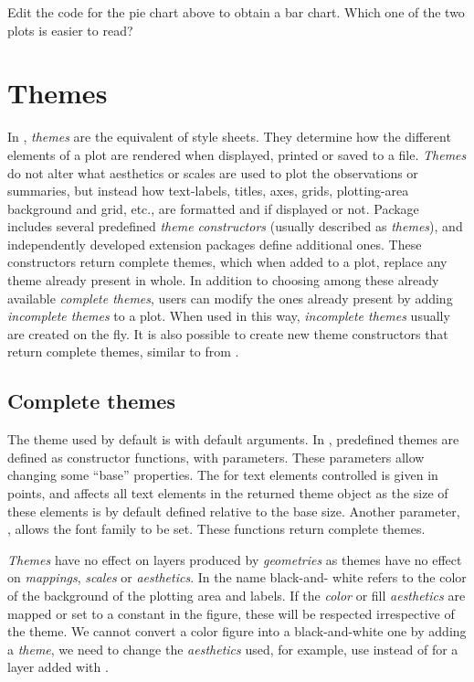 \documentclass[krantz2]{krantz}\usepackage{knitr}
\begin{document}
\begin{playground}
Edit the code for the pie chart above to obtain a bar chart. Which one of the two plots is easier to read?
\end{playground}

\section{Themes}\label{sec:plot:themes}
In \ggplot, \emph{themes} are the equivalent of style sheets. They determine how the different elements of a plot are rendered when displayed, printed or saved to a file. \emph{Themes} do not alter what aesthetics or scales are used to plot the observations or summaries, but instead how text-labels, titles, axes, grids, plotting-area background and grid, etc., are formatted and if displayed or not. Package \ggplot includes several predefined \emph{theme constructors} (usually described as \emph{themes}), and independently developed extension packages define additional ones. These constructors return complete themes, which when added to a plot, replace any theme already present in whole. In addition to choosing among these already available \emph{complete themes}, users can modify the ones already present by adding \emph{incomplete themes} to a plot. When used in this way, \emph{incomplete themes} usually are created on the fly. It is also possible to create new theme constructors that return complete themes, similar to  from \ggplot.

\subsection{Complete themes}
The theme used by default is  with default arguments. In , predefined themes are defined as constructor functions, with parameters. These parameters allow changing some ``base'' properties. The  for text elements controlled is given in points, and affects all text elements in the returned theme object as the size of these elements is by default defined relative to the base size. Another parameter, , allows the font family to be set. These functions return complete themes.

\begin{warningbox}
\emph{Themes} have no effect on layers produced by \emph{geometries} as themes have no effect on \emph{mappings}, \emph{scales} or \emph{aesthetics}. In the name  black-and- white refers to the color of the background of the plotting area and labels. If the \emph{color} or fill \emph{aesthetics} are mapped or set to a constant in the figure, these will be respected irrespective of the theme. We cannot convert a color figure into a black-and-white one by adding a \emph{theme}, we need to change the \emph{aesthetics} used, for example, use  instead of  for a layer added with .
\end{warningbox}
\end{document}
